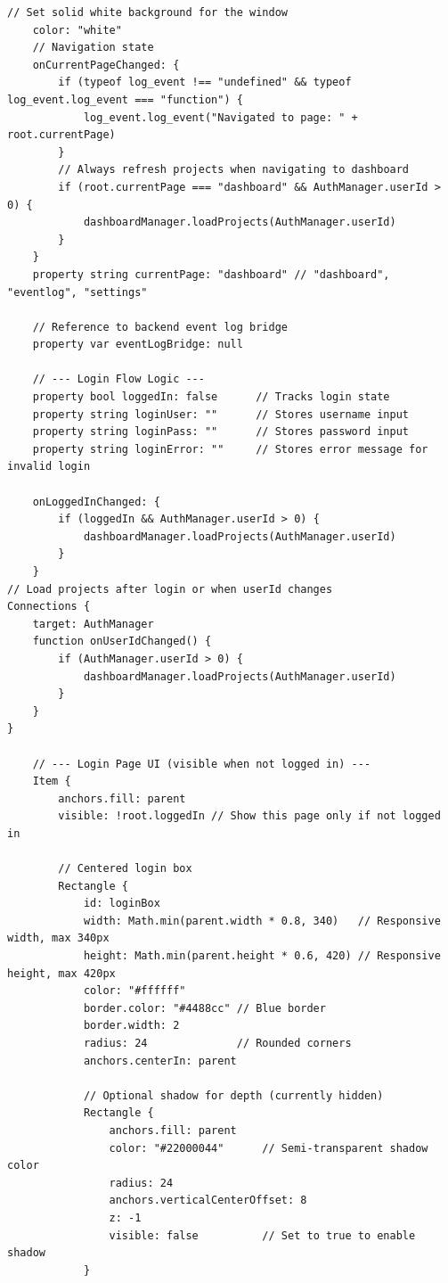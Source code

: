 \documentclass{report}
\begin{document}
\begin{lstlisting}[style=qmlstyle]
    // Set solid white background for the window
    color: "white"
    // Navigation state
    onCurrentPageChanged: {
        if (typeof log_event !== "undefined" && typeof log_event.log_event === "function") {
            log_event.log_event("Navigated to page: " + root.currentPage)
        }
        // Always refresh projects when navigating to dashboard
        if (root.currentPage === "dashboard" && AuthManager.userId > 0) {
            dashboardManager.loadProjects(AuthManager.userId)
        }
    }
    property string currentPage: "dashboard" // "dashboard", "eventlog", "settings"

    // Reference to backend event log bridge
    property var eventLogBridge: null

    // --- Login Flow Logic ---
    property bool loggedIn: false      // Tracks login state
    property string loginUser: ""      // Stores username input
    property string loginPass: ""      // Stores password input
    property string loginError: ""     // Stores error message for invalid login

    onLoggedInChanged: {
        if (loggedIn && AuthManager.userId > 0) {
            dashboardManager.loadProjects(AuthManager.userId)
        }
    }
// Load projects after login or when userId changes
Connections {
    target: AuthManager
    function onUserIdChanged() {
        if (AuthManager.userId > 0) {
            dashboardManager.loadProjects(AuthManager.userId)
        }
    }
}

    // --- Login Page UI (visible when not logged in) ---
    Item {
        anchors.fill: parent
        visible: !root.loggedIn // Show this page only if not logged in

        // Centered login box
        Rectangle {
            id: loginBox
            width: Math.min(parent.width * 0.8, 340)   // Responsive width, max 340px
            height: Math.min(parent.height * 0.6, 420) // Responsive height, max 420px
            color: "#ffffff"
            border.color: "#4488cc" // Blue border
            border.width: 2
            radius: 24              // Rounded corners
            anchors.centerIn: parent

            // Optional shadow for depth (currently hidden)
            Rectangle {
                anchors.fill: parent
                color: "#22000044"      // Semi-transparent shadow color
                radius: 24
                anchors.verticalCenterOffset: 8
                z: -1
                visible: false          // Set to true to enable shadow
            }


\end{lstlisting}
\end{document}
